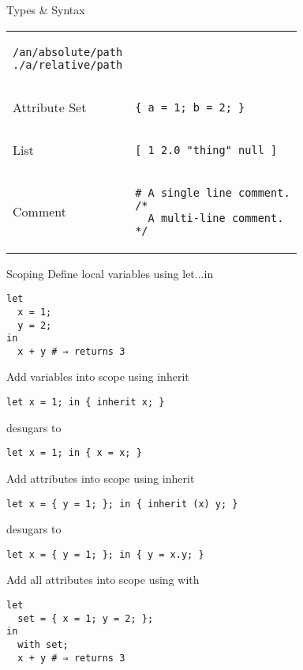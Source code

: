 \documentclass[landscape, 10pt]{article}
\begin{document}
\begin{multicols*}{3}
\begin{ctexpression}{Types \& Syntax}
\begin{tabular}{l p{}}
\begin{minipage}{0.5\textwidth}
\begin{verbatim}
/an/absolute/path
./a/relative/path
            \end{verbatim}
        \end{minipage}
        \\
        Attribute Set &
        \begin{minipage}{0.5\textwidth}
            \begin{verbatim}
{ a = 1; b = 2; }
            \end{verbatim}
        \end{minipage}
        \\
        List &
        \begin{minipage}{0.5\textwidth}
            \begin{verbatim}
[ 1 2.0 "thing" null ]
            \end{verbatim}
        \end{minipage}
        \\
        Comment &
        \begin{minipage}{0.5\textwidth}
            \begin{verbatim}
# A single line comment.
/*
  A multi-line comment.
*/
            \end{verbatim}
        \end{minipage}
    \end{tabular}
\end{ctexpression}

\vfill

\begin{ctexpression}{Scoping}
{\color{nixdarkblue}Define local variables using} let...in
    \begin{verbatim}
let
  x = 1;
  y = 2;
in
  x + y # ⇒ returns 3
    \end{verbatim}
    \tcbline
{\color{nixdarkblue}Add variables into scope using} inherit
    \begin{verbatim}
let x = 1; in { inherit x; }
    \end{verbatim}
{\color{nixdarkblue}desugars to}
    \begin{verbatim}
let x = 1; in { x = x; }
    \end{verbatim}
    \tcbline
{\color{nixdarkblue}Add attributes into scope using} inherit
    \begin{verbatim}
let x = { y = 1; }; in { inherit (x) y; }
    \end{verbatim}
{\color{nixdarkblue}desugars to}
    \begin{verbatim}
let x = { y = 1; }; in { y = x.y; }
    \end{verbatim}
    \tcbline
{\color{nixdarkblue}Add all attributes into scope using} with
    \begin{verbatim}
let
  set = { x = 1; y = 2; };
in
  with set;
  x + y # ⇒ returns 3
    \end{verbatim}
\end{ctexpression}


\end{multicols*}
\end{document}
